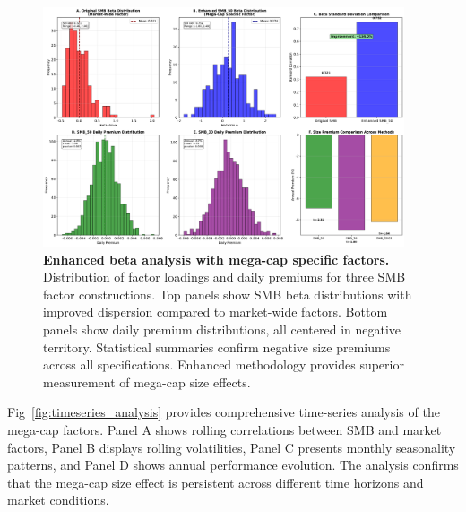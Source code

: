\documentclass[10pt,letterpaper]{article}
\begin{document}
\begin{figure}[!h]
\centering
\includegraphics[width=0.95\textwidth]{figures/fig_enhanced_beta_analysis.pdf}
\caption{\textbf{Enhanced beta analysis with mega-cap specific factors.}
Distribution of factor loadings and daily premiums for three SMB factor constructions. Top panels show SMB beta distributions with improved dispersion compared to market-wide factors. Bottom panels show daily premium distributions, all centered in negative territory. Statistical summaries confirm negative size premiums across all specifications. Enhanced methodology provides superior measurement of mega-cap size effects.}
\label{fig:enhanced_beta}
\end{figure}

Fig~\ref{fig:timeseries_analysis} provides comprehensive time-series analysis of the mega-cap factors. Panel A shows rolling correlations between SMB and market factors, Panel B displays rolling volatilities, Panel C presents monthly seasonality patterns, and Panel D shows annual performance evolution. The analysis confirms that the mega-cap size effect is persistent across different time horizons and market conditions.
\end{document}
